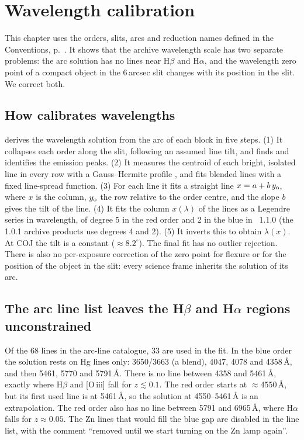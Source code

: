 \chapter{Wavelength calibration}
\label{sec:wavelength}

This chapter uses the orders, slits, arcs and reduction names defined in the Conventions, p.~\pageref{sec:conventions}. It shows
that the archive wavelength scale has two separate problems: the arc solution has no lines near H$\beta$ and
H$\alpha$, and the wavelength zero point of a compact object in the 6\,arcsec slit changes with its position in the
slit. We correct both.

\section{How \banzai{} calibrates wavelengths}
\label{sec:wl_banzai}
\banzai{} derives the wavelength solution from the arc of each block in five steps. (1) It collapses each order along
the slit, following an assumed line tilt, and finds and identifies the emission peaks. (2) It measures the centroid of each
bright, isolated line in every row with a Gauss--Hermite profile \citep{Cappellari2017}, and fits blended lines with a
fixed line-spread function. (3) For each line it fits a straight line $x=a+b\,y_{\rm o}$, where $x$ is the column,
$y_{\rm o}$ the row relative to the order centre, and the slope $b$ gives the tilt of the line. (4) It fits the column
$x(\lambda)$ of the lines as a Legendre series in wavelength, of degree 5 in the red order and 2 in the blue in
\banzai{}~1.1.0 (the 1.0.1 archive products use degrees 4 and 2). (5) It inverts this to obtain $\lambda(x)$. At COJ
the tilt is a constant ($\approx8.2^\circ$). The final fit has no outlier rejection. There is also no per-exposure
correction of the zero point for flexure or for the position of the object in the slit: every science frame inherits
the solution of its arc.

\section{The arc line list leaves the H$\beta$ and H$\alpha$ regions unconstrained}
\label{sec:wl_lines}
Of the 68 lines in the \banzai{} arc-line catalogue, 33 are used in the fit. In the blue order the solution rests on
Hg lines only: 3650/3663 (a blend), 4047, 4078 and 4358\,\AA, and then 5461, 5770 and 5791\,\AA{}. There is no line
between 4358 and 5461\,\AA{}, exactly where H$\beta$ and [O\,{\sc iii}] fall for $z\lesssim0.1$. The red order
starts at $\approx4550$\,\AA{}, but its first used line is at 5461\,\AA{}, so the solution at 4550--5461\,\AA{} is
an extrapolation. The red order also has no line between 5791 and 6965\,\AA{}, where H$\alpha$ falls for
$z\approx0.05$. The Zn lines that would fill the blue gap are disabled in the \banzai{} line list, with the comment
``removed until we start turning on the Zn lamp again''.

